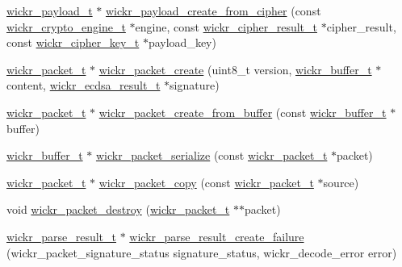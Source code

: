 \begin{DoxyCompactItemize}
\item 
\mbox{\hyperlink{structwickr__payload}{wickr\+\_\+payload\+\_\+t}} $\ast$ \mbox{\hyperlink{group__wickr__protocol_gaeeebf95ba580b92254a91009245028ee}{wickr\+\_\+payload\+\_\+create\+\_\+from\+\_\+cipher}} (const \mbox{\hyperlink{structwickr__crypto__engine}{wickr\+\_\+crypto\+\_\+engine\+\_\+t}} $\ast$engine, const \mbox{\hyperlink{structwickr__cipher__result}{wickr\+\_\+cipher\+\_\+result\+\_\+t}} $\ast$cipher\+\_\+result, const \mbox{\hyperlink{structwickr__cipher__key}{wickr\+\_\+cipher\+\_\+key\+\_\+t}} $\ast$payload\+\_\+key)
\item 
\mbox{\hyperlink{structwickr__packet}{wickr\+\_\+packet\+\_\+t}} $\ast$ \mbox{\hyperlink{group__wickr__protocol_gac952913ddaf848d2def181cd55b30883}{wickr\+\_\+packet\+\_\+create}} (uint8\+\_\+t version, \mbox{\hyperlink{structwickr__buffer}{wickr\+\_\+buffer\+\_\+t}} $\ast$content, \mbox{\hyperlink{structwickr__ecdsa__result}{wickr\+\_\+ecdsa\+\_\+result\+\_\+t}} $\ast$signature)
\item 
\mbox{\hyperlink{structwickr__packet}{wickr\+\_\+packet\+\_\+t}} $\ast$ \mbox{\hyperlink{group__wickr__protocol_ga3427a40815c9f65a78516405d1b88072}{wickr\+\_\+packet\+\_\+create\+\_\+from\+\_\+buffer}} (const \mbox{\hyperlink{structwickr__buffer}{wickr\+\_\+buffer\+\_\+t}} $\ast$buffer)
\item 
\mbox{\hyperlink{structwickr__buffer}{wickr\+\_\+buffer\+\_\+t}} $\ast$ \mbox{\hyperlink{group__wickr__protocol_gaa983fe863635b69d69d6d86d01443ecf}{wickr\+\_\+packet\+\_\+serialize}} (const \mbox{\hyperlink{structwickr__packet}{wickr\+\_\+packet\+\_\+t}} $\ast$packet)
\item 
\mbox{\hyperlink{structwickr__packet}{wickr\+\_\+packet\+\_\+t}} $\ast$ \mbox{\hyperlink{group__wickr__protocol_ga0c95ad86819bacf98c11115d748039db}{wickr\+\_\+packet\+\_\+copy}} (const \mbox{\hyperlink{structwickr__packet}{wickr\+\_\+packet\+\_\+t}} $\ast$source)
\item 
void \mbox{\hyperlink{group__wickr__protocol_gab15d7556ad2806aa823ec2d3e3bf5a46}{wickr\+\_\+packet\+\_\+destroy}} (\mbox{\hyperlink{structwickr__packet}{wickr\+\_\+packet\+\_\+t}} $\ast$$\ast$packet)
\item 
\mbox{\hyperlink{structwickr__parse__result}{wickr\+\_\+parse\+\_\+result\+\_\+t}} $\ast$ \mbox{\hyperlink{group__wickr__protocol_gac2673bcfeae2f8d693e523809bb6bb30}{wickr\+\_\+parse\+\_\+result\+\_\+create\+\_\+failure}} (wickr\+\_\+packet\+\_\+signature\+\_\+status signature\+\_\+status, wickr\+\_\+decode\+\_\+error error)
\item 
$$
\end{DoxyCompactItemize}
